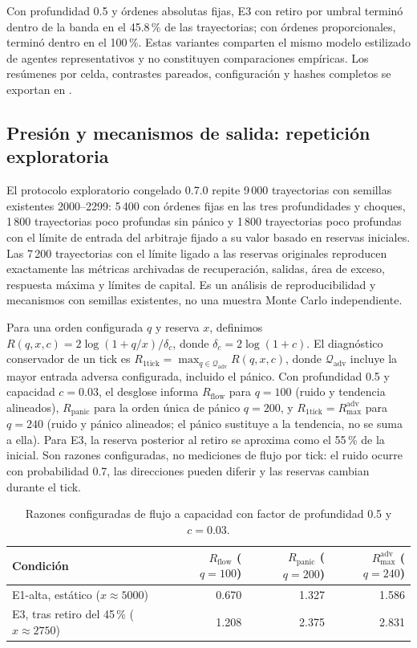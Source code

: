 Con profundidad 0.5 y órdenes absolutas fijas, E3 con retiro por umbral terminó dentro de la banda en el 45.8\,\% de las trayectorias; con órdenes proporcionales, terminó dentro en el 100\,\%. Estas variantes comparten el mismo modelo estilizado de agentes representativos y no constituyen comparaciones empíricas. Los resúmenes por celda, contrastes pareados, configuración y hashes completos se exportan en .

\subsection{Presión y mecanismos de salida: repetición exploratoria}

El protocolo exploratorio congelado 0.7.0 repite 9\,000 trayectorias con semillas existentes 2000--2299: 5\,400 con órdenes fijas en las tres profundidades y choques, 1\,800 trayectorias poco profundas sin pánico y 1\,800 trayectorias poco profundas con el límite de entrada del arbitraje fijado a su valor basado en reservas iniciales. Las 7\,200 trayectorias con el límite ligado a las reservas originales reproducen exactamente las métricas archivadas de recuperación, salidas, área de exceso, respuesta máxima y límites de capital. Es un análisis de reproducibilidad y mecanismos con semillas existentes, no una muestra Monte Carlo independiente.

Para una orden configurada $q$ y reserva $x$, definimos $R(q,x,c)=2\log(1+q/x)/\delta_c$, donde $\delta_c=2\log(1+c)$. El diagnóstico conservador de un tick es $R_{\mathrm{1tick}}=\max_{q\in\mathcal Q_{\mathrm{adv}}}R(q,x,c)$, donde $\mathcal Q_{\mathrm{adv}}$ incluye la mayor entrada adversa configurada, incluido el pánico. Con profundidad 0.5 y capacidad $c=0.03$, el desglose informa $R_{\mathrm{flow}}$ para $q=100$ (ruido y tendencia alineados), $R_{\mathrm{panic}}$ para la orden única de pánico $q=200$, y $R_{\mathrm{1tick}}=R_{\max}^{\mathrm{adv}}$ para $q=240$ (ruido y pánico alineados; el pánico sustituye a la tendencia, no se suma a ella). Para E3, la reserva posterior al retiro se aproxima como el 55\,\% de la inicial. Son razones configuradas, no mediciones de flujo por tick: el ruido ocurre con probabilidad 0.7, las direcciones pueden diferir y las reservas cambian durante el tick.

\begin{table}[htbp]
\centering
\caption{Razones configuradas de flujo a capacidad con factor de profundidad 0.5 y $c=0.03$.}
\label{tab:pressure-ratio}
\small
\begin{tabular}{@{}lrrr@{}}
\toprule
Condición & $R_{\mathrm{flow}}$ ($q=100$) & $R_{\mathrm{panic}}$ ($q=200$) & $R_{\max}^{\mathrm{adv}}$ ($q=240$) \\
\midrule
E1-alta, estático ($x\approx5000$) & 0.670 & 1.327 & 1.586 \\
E3, tras retiro del 45\,\% ($x\approx2750$) & 1.208 & 2.375 & 2.831 \\
\bottomrule
\end{tabular}
\end{table}

